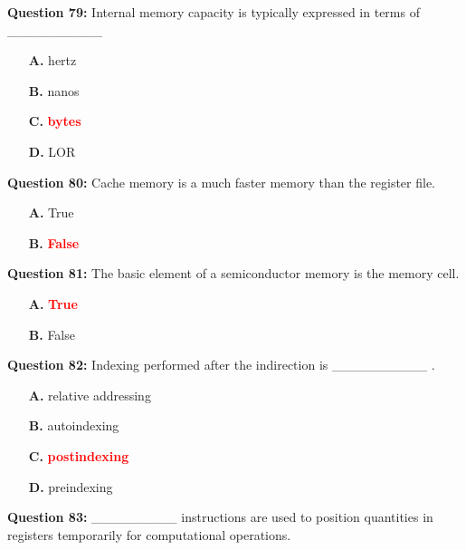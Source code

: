\documentclass[12pt,a4paper]{article}
\begin{document}
\vspace{0.5cm}

\textbf{Question 79:} Internal memory capacity is typically expressed in terms of __________

\begin{itemize}
    \item[\textbf{A.}] hertz
    \item[\textbf{B.}] nanos
    \item[\textbf{C.}] \textcolor{red}{\textbf{bytes}}
    \item[\textbf{D.}] LOR
\end{itemize}

\vspace{0.5cm}

\textbf{Question 80:} Cache memory is a much faster memory than the register file.

\begin{itemize}
    \item[\textbf{A.}] True
    \item[\textbf{B.}] \textcolor{red}{\textbf{False}}
\end{itemize}

\vspace{0.5cm}

\textbf{Question 81:} The basic element of a semiconductor memory is the memory cell.

\begin{itemize}
    \item[\textbf{A.}] \textcolor{red}{\textbf{True}}
    \item[\textbf{B.}] False
\end{itemize}

\vspace{0.5cm}

\textbf{Question 82:} Indexing performed after the indirection is __________ .

\begin{itemize}
    \item[\textbf{A.}] relative addressing
    \item[\textbf{B.}] autoindexing
    \item[\textbf{C.}] \textcolor{red}{\textbf{postindexing}}
    \item[\textbf{D.}] preindexing
\end{itemize}

\vspace{0.5cm}

\textbf{Question 83:} _________ instructions are used to position quantities in registers temporarily for computational operations.
\end{document}
